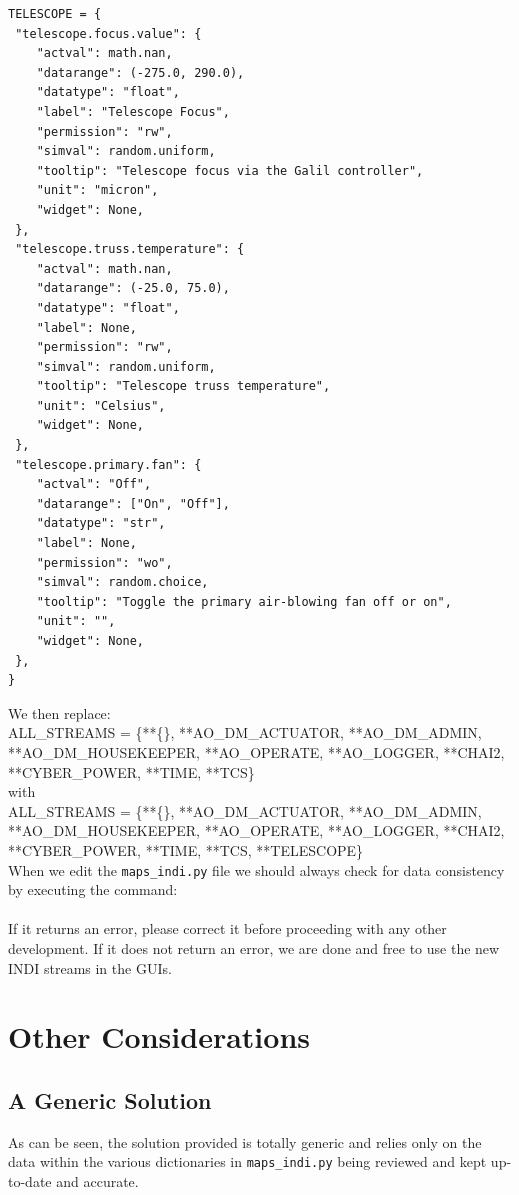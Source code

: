 \documentclass[12pt,twoside]{article}
\begin{document}
\begin{verbatim}
TELESCOPE = {
 "telescope.focus.value": {
    "actval": math.nan,
    "datarange": (-275.0, 290.0),
    "datatype": "float",
    "label": "Telescope Focus",
    "permission": "rw",
    "simval": random.uniform,
    "tooltip": "Telescope focus via the Galil controller",
    "unit": "micron",
    "widget": None,
 },
 "telescope.truss.temperature": {
    "actval": math.nan,
    "datarange": (-25.0, 75.0),
    "datatype": "float",
    "label": None,
    "permission": "rw",
    "simval": random.uniform,
    "tooltip": "Telescope truss temperature",
    "unit": "Celsius",
    "widget": None,
 },
 "telescope.primary.fan": {
    "actval": "Off",
    "datarange": ["On", "Off"],
    "datatype": "str",
    "label": None,
    "permission": "wo",
    "simval": random.choice,
    "tooltip": "Toggle the primary air-blowing fan off or on",
    "unit": "",
    "widget": None,
 },
}
\end{verbatim}

We then replace:\\ 

\noindent \small{ALL\_STREAMS = \{**\{\}, **AO\_DM\_ACTUATOR, **AO\_DM\_ADMIN, **AO\_DM\_HOUSEKEEPER, **AO\_OPERATE, **AO\_LOGGER, **CHAI2, **CYBER\_POWER, **TIME, **TCS\}} \\

with \\

\noindent \small{ALL\_STREAMS = \{**\{\}, **AO\_DM\_ACTUATOR, **AO\_DM\_ADMIN, **AO\_DM\_HOUSEKEEPER, **AO\_OPERATE, **AO\_LOGGER, **CHAI2, **CYBER\_POWER, **TIME, **TCS, **TELESCOPE\}} \\

When we edit the {\tt maps\_indi.py} file we should always check for data consistency by executing the command: \\

\noindent  {} \\

If it returns an error, please correct it before proceeding with any other development. If it does not return an error, 
we are done and free to use the new INDI streams in the GUIs.
 
\section{Other Considerations}
\label{Other Considerations}

\subsection{A Generic Solution}
\label{A Generic Solution}
As can be seen, the solution provided is totally generic and relies only on the data within the various dictionaries
in  {\tt maps\_indi.py} being reviewed and kept up-to-date and accurate.
\end{document}

